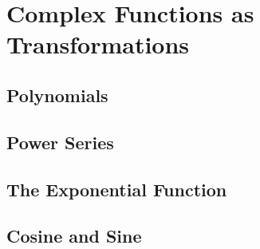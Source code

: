 \section{Complex Functions as Transformations}

\begin{card}
    \subsection{Polynomials}

    \begin{compactdesc}
    \item[]
    \end{compactdesc}
\end{card}




\begin{card}
    \subsection{Power Series}

    \begin{compactdesc}
    \item[]
    \end{compactdesc}
\end{card}




\begin{card}
    \subsection{The Exponential Function}

    \begin{compactdesc}
    \item[]
    \end{compactdesc}
\end{card}




\begin{card}
    \subsection{Cosine and Sine}

    \begin{compactdesc}
    \item[]
    \end{compactdesc}
\end{card}




